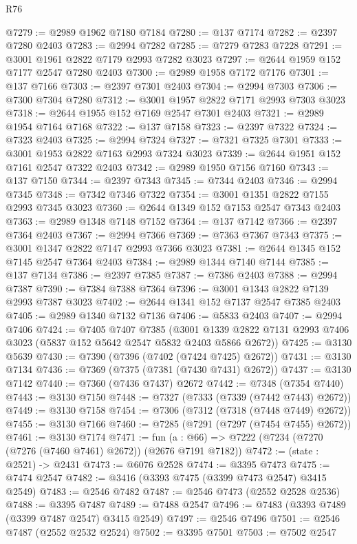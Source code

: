 \begin{lexlean}{R76}
\begin{coremodule}
@7279 := @2989 @1962 @7180 @7184
@7280 := @137 @7174
@7282 := @2397 @7280 @2403
@7283 := @2994 @7282
@7285 := @7279 @7283 @7228
@7291 := @3001 @1961 @2822 @7179 @2993 @7282 @3023
@7297 := @2644 @1959 @152 @7177 @2547 @7280 @2403
@7300 := @2989 @1958 @7172 @7176
@7301 := @137 @7166
@7303 := @2397 @7301 @2403
@7304 := @2994 @7303
@7306 := @7300 @7304 @7280
@7312 := @3001 @1957 @2822 @7171 @2993 @7303 @3023
@7318 := @2644 @1955 @152 @7169 @2547 @7301 @2403
@7321 := @2989 @1954 @7164 @7168
@7322 := @137 @7158
@7323 := @2397 @7322
@7324 := @7323 @2403
@7325 := @2994 @7324
@7327 := @7321 @7325 @7301
@7333 := @3001 @1953 @2822 @7163 @2993 @7324 @3023
@7339 := @2644 @1951 @152 @7161 @2547 @7322 @2403
@7342 := @2989 @1950 @7156 @7160
@7343 := @137 @7150
@7344 := @2397 @7343
@7345 := @7344 @2403
@7346 := @2994 @7345
@7348 := @7342 @7346 @7322
@7354 := @3001 @1351 @2822 @7155 @2993 @7345 @3023
@7360 := @2644 @1349 @152 @7153 @2547 @7343 @2403
@7363 := @2989 @1348 @7148 @7152
@7364 := @137 @7142
@7366 := @2397 @7364 @2403
@7367 := @2994 @7366
@7369 := @7363 @7367 @7343
@7375 := @3001 @1347 @2822 @7147 @2993 @7366 @3023
@7381 := @2644 @1345 @152 @7145 @2547 @7364 @2403
@7384 := @2989 @1344 @7140 @7144
@7385 := @137 @7134
@7386 := @2397 @7385
@7387 := @7386 @2403
@7388 := @2994 @7387
@7390 := @7384 @7388 @7364
@7396 := @3001 @1343 @2822 @7139 @2993 @7387 @3023
@7402 := @2644 @1341 @152 @7137 @2547 @7385 @2403
@7405 := @2989 @1340 @7132 @7136
@7406 := @5833 @2403
@7407 := @2994 @7406
@7424 := @7405
    @7407
    @7385
    (@3001 @1339 @2822 @7131 @2993 @7406 @3023 (@5837 @152 @5642 @2547 @5832 @2403 @5866 @2672))
@7425 := @3130 @5639
@7430 := @7390 (@7396 (@7402 (@7424 @7425) @2672))
@7431 := @3130 @7134
@7436 := @7369 (@7375 (@7381 (@7430 @7431) @2672))
@7437 := @3130 @7142
@7440 := @7360 (@7436 @7437) @2672
@7442 := @7348 (@7354 @7440)
@7443 := @3130 @7150
@7448 := @7327 (@7333 (@7339 (@7442 @7443) @2672))
@7449 := @3130 @7158
@7454 := @7306 (@7312 (@7318 (@7448 @7449) @2672))
@7455 := @3130 @7166
@7460 := @7285 (@7291 (@7297 (@7454 @7455) @2672))
@7461 := @3130 @7174
@7471 := fun (a : @66) => @7222 (@7234 (@7270 (@7276 (@7460 @7461) @2672)) (@2676 @7191 @7182))
@7472 := (state : @2521) -> @2431
@7473 := @6076 @2528
@7474 := @3395 @7473
@7475 := @7474 @2547
@7482 := @3416 (@3393 @7475 (@3399 @7473 @2547) @3415 @2549)
@7483 := @2546 @7482
@7487 := @2546 @7473 (@2552 @2528 @2536)
@7488 := @3395 @7487
@7489 := @7488 @2547
@7496 := @7483 (@3393 @7489 (@3399 @7487 @2547) @3415 @2549)
@7497 := @2546 @7496
@7501 := @2546 @7487 (@2552 @2532 @2524)
@7502 := @3395 @7501
@7503 := @7502 @2547

\end{coremodule}
\end{lexlean}

